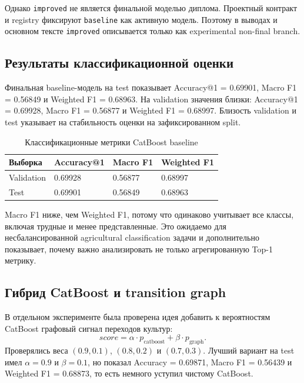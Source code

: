 \documentclass[a4paper,article,14pt]{extarticle}
\begin{document}
Однако \texttt{improved} не является финальной моделью диплома. Проектный контракт и registry фиксируют \texttt{baseline} как активную модель. Поэтому в выводах и основном тексте \texttt{improved} описывается только как experimental non-final branch.

\subsection{Результаты классификационной оценки}

Финальная baseline-модель на test показывает Accuracy@1 = 0.69901, Macro F1 = 0.56849 и Weighted F1 = 0.68963. На validation значения близки: Accuracy@1 = 0.69928, Macro F1 = 0.56877 и Weighted F1 = 0.68997. Близость validation и test указывает на стабильность оценки на зафиксированном split.

\begin{center}
\begin{longtable}{|p{4cm}|p{3cm}|p{3cm}|p{3cm}|}
\caption{Классификационные метрики CatBoost baseline}\\
\hline
Выборка & Accuracy@1 & Macro F1 & Weighted F1\\
\hline
Validation & 0.69928 & 0.56877 & 0.68997\\
\hline
Test & 0.69901 & 0.56849 & 0.68963\\
\hline
\end{longtable}
\end{center}

Macro F1 ниже, чем Weighted F1, потому что одинаково учитывает все классы, включая трудные и менее представленные. Это ожидаемо для несбалансированной agricultural classification задачи и дополнительно показывает, почему важно анализировать не только агрегированную Top-1 метрику.

\subsection{Гибрид CatBoost и transition graph}

В отдельном эксперименте была проверена идея добавить к вероятностям CatBoost графовый сигнал переходов культур:
\begin{equation}
    score = \alpha \cdot p_{\mathrm{catboost}} + \beta \cdot p_{\mathrm{graph}}.
\end{equation}
Проверялись веса $(0.9, 0.1)$, $(0.8, 0.2)$ и $(0.7, 0.3)$. Лучший вариант на test имел $\alpha=0.9$ и $\beta=0.1$, но показал Accuracy = 0.69871, Macro F1 = 0.56439 и Weighted F1 = 0.68873, то есть немного уступил чистому CatBoost.
\end{document}
